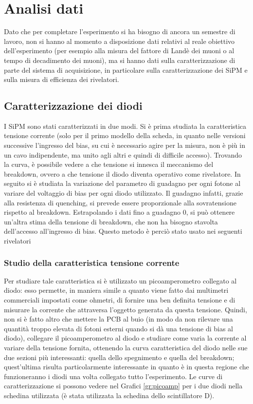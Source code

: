 \section{Analisi dati}
Dato che per completare l'esperimento si ha bisogno di ancora un semestre di lavoro, non si hanno al momento a disposizione dati relativi al reale obiettivo dell'esperimento
(per esempio alla misura del fattore di Landè dei muoni o al tempo di decadimento dei muoni), ma si hanno dati sulla caratterizzazione di parte del sistema di acquisizione,
in particolare sulla caratterizzazione dei SiPM e sulla misura di efficienza dei rivelatori.

\subsection{Caratterizzazione dei diodi}
I SiPM sono stati caratterizzati in due modi. Si è prima studiata la caratteristica tensione corrente (solo per il primo modello della scheda, in quanto nelle versioni successive l'ingresso del bias, su cui \`e necessario agire per la misura, non \`e pi\`u in un cavo indipendente, ma unito agli altri e quindi di difficile accesso). Trovando la curva, \`e possibile vedere a che tensione si innesca il meccanismo del breakdown, ovvero a che tensione il diodo diventa operativo come rivelatore.
In seguito si è studiata la variazione del parametro di guadagno per ogni fotone al variare del voltaggio di bias per ogni diodo utilizzato. Il guadagno infatti, grazie alla resistenza di quenching, si prevede essere proporzionale alla sovratensione rispetto al breakdown. Estrapolando i dati fino a guadagno 0, si pu\`o ottenere un'altra stima della tensione di breakdown, che non ha bisogno stavolta dell'accesso all'ingresso di bias. Questo metodo \`e perci\`o stato usato nei seguenti rivelatori

\subsubsection{Studio della caratteristica tensione corrente}
Per studiare tale caratteristica si è utilizzato un picoamperometro collegato al diodo: esso permette, in maniera simile a quanto viene fatto dai multimetri commerciali
impostati come ohmetri, di fornire una ben definita tensione e di misurare la corrente che attraversa l'oggetto generata da questa tensione. Quindi,
non si è fatto altro che mettere la PCB al buio (in modo da non rilevare una quantità troppo elevata di fotoni esterni quando si dà una tensione di bias al diodo),
collegare il picoamperometro al diodo e studiare come varia la corrente al variare della tensione fornita, ottenendo la curva caratteristica del diodo nelle sue due
sezioni più interessanti: quella dello spegnimento e quella del breakdown; quest'ultima risulta particolarmente interessante in quanto è in questa regione che funzioneranno
i diodi una volta collegato tutto l'esperimento. Le curve di caratterizzazione si possono vedere nel Grafici \ref{gr:picoamp} per i due  diodi nella schedina utilizzata (è stata utilizzata la schedina dello scintillatore D).

